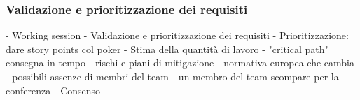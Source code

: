 \subsubsection{Validazione e prioritizzazione dei requisiti}


- Working session
  - Validazione e prioritizzazione dei requisiti
    - Prioritizzazione: dare story points col poker
  - Stima della quantità di lavoro
  - "critical path" consegna in tempo
  - rischi e piani di mitigazione
    - normativa europea che cambia
    - possibili assenze di membri del team
    - un membro del team scompare per la conferenza
  - Consenso

